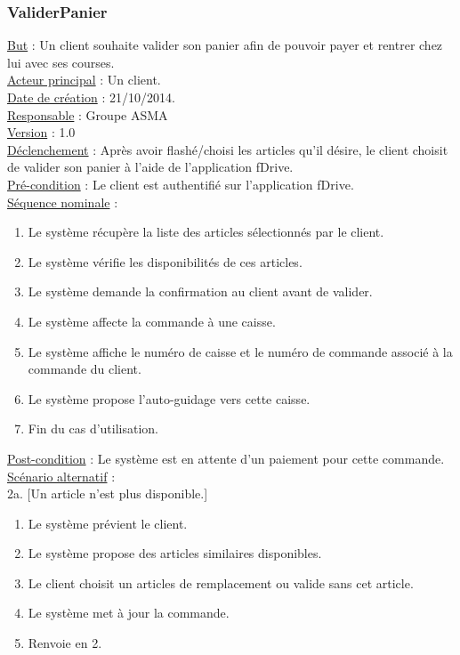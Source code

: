 \subsubsection{ValiderPanier}
	\underline{But} : Un client souhaite valider son panier afin de pouvoir payer et rentrer chez lui avec ses courses.\\
	\underline{Acteur principal} : Un client.\\
	\underline{Date de création} : 21/10/2014.\\
	\underline{Responsable} : Groupe ASMA\\
	\underline{Version} : 1.0\\
	\underline{Déclenchement} : Après avoir flashé/choisi les articles qu'il désire, le client choisit de valider son panier à l'aide de l'application fDrive.\\
	\underline{Pré-condition} : Le client est authentifié sur l'application fDrive.\\
	\underline{Séquence nominale} :
		\begin{enumerate}
			\item Le système récupère la liste des articles sélectionnés par le client.
			\item Le système vérifie les disponibilités de ces articles.
			\item Le système demande la confirmation au client avant de valider.
			\item Le système affecte la commande à une caisse.
			\item Le système affiche le numéro de caisse et le numéro de commande associé à la commande du client.
			\item Le système propose l'auto-guidage vers cette caisse.
			\item Fin du cas d'utilisation.
		\end{enumerate}
	\underline{Post-condition} : Le système est en attente d'un paiement pour cette commande.\\
	\underline{Scénario alternatif} :\\
		2a. [Un article n'est plus disponible.]
			\begin{enumerate}[label=2a.\arabic* ]
				\item Le système prévient le client.
				\item Le système propose des articles similaires disponibles.
				\item Le client choisit un articles de remplacement ou valide sans cet article.
				\item Le système met à jour la commande.
				\item Renvoie en 2.
			\end{enumerate}
